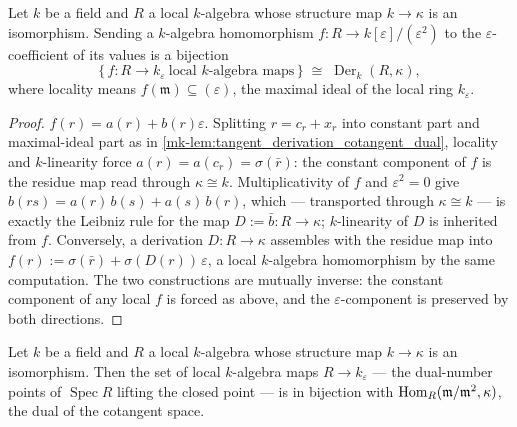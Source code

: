 \begin{lemma}\label{mk-lem:tangent_dual_number_derivation}
  \leanok

  Let \(k\) be a field and \(R\) a local \(k\)-algebra whose
  structure map \(k \to \kappa\) is an isomorphism. Sending a
  \(k\)-algebra homomorphism \(f : R \to k[\varepsilon]/(\varepsilon^2)\)
  to the \(\varepsilon\)-coefficient of its values is a bijection
  \[
    \{\, f : R \to k_\varepsilon \ \text{local $k$-algebra maps} \,\}
    \;\cong\;
    \operatorname{Der}_k(R, \kappa),
  \]
  where locality means \(f(\mathfrak m) \subseteq (\varepsilon)\),
  the maximal ideal of the local ring \(k_\varepsilon\).
\end{lemma}

\begin{proof}
  \leanokWrite \(f(r) = a(r) + b(r)\varepsilon\). Splitting
  \(r = c_r + x_r\) into constant part and maximal-ideal part as in
  \ref{mk-lem:tangent_derivation_cotangent_dual}, locality and
  \(k\)-linearity force \(a(r) = a(c_r) = \sigma(\bar r)\): the
  constant component of \(f\) is the residue map read through
  \(\kappa \cong k\). Multiplicativity of \(f\) and
  \(\varepsilon^2 = 0\) give
  \(b(rs) = a(r)\,b(s) + a(s)\,b(r)\), which — transported through
  \(\kappa \cong k\) — is exactly the Leibniz rule for the map
  \(D := \bar b : R \to \kappa\); \(k\)-linearity of \(D\) is
  inherited from \(f\). Conversely, a derivation
  \(D : R \to \kappa\) assembles with the residue map into
  \(f(r) := \sigma(\bar r) + \sigma(D(r))\,\varepsilon\), a local
  \(k\)-algebra homomorphism by the same computation. The two
  constructions are mutually inverse: the constant component of any
  local \(f\) is forced as above, and the \(\varepsilon\)-component
  is preserved by both directions.
\end{proof}

\begin{corollary}\label{mk-cor:tangent_dual_number_cotangent_dual}
  \leanok

  Let \(k\) be a field and \(R\) a local \(k\)-algebra whose
  structure map \(k \to \kappa\) is an isomorphism. Then the set of
  local \(k\)-algebra maps \(R \to k_\varepsilon\) — the dual-number
  points of \(\operatorname{Spec} R\) lifting the closed point — is
  in bijection with
  \(\operatorname{Hom}_R(\mathfrak m/\mathfrak m^2, \kappa)\), the dual of the
  cotangent space.
\end{corollary}

